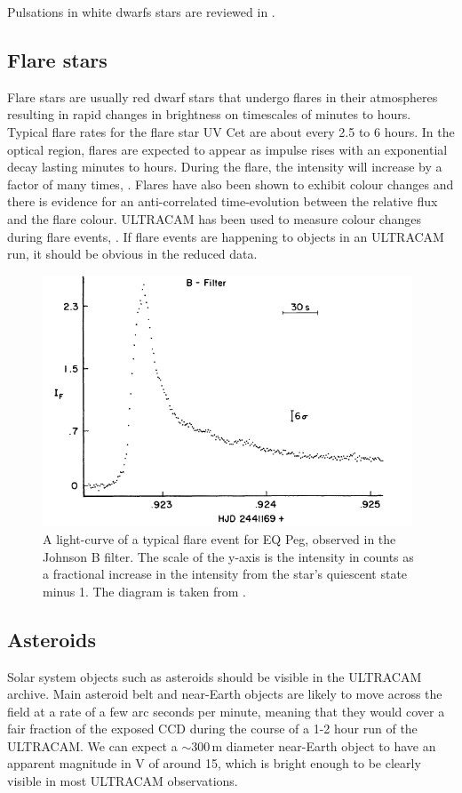 Pulsations in white dwarfs stars are reviewed in \citet{wingetreview}.

\subsection{Flare stars}
Flare stars are usually red dwarf stars that undergo flares in their atmospheres resulting in rapid changes in brightness on timescales of minutes to hours. Typical flare rates for the flare star {UV Cet} are about every 2.5 to 6 hours. In the optical region, flares are expected to appear as impulse rises with an exponential decay lasting minutes to hours. During the flare, the intensity will increase by a factor of many times, \citep{typicalflares}. Flares have also been shown to exhibit colour changes and there is evidence for an anti-correlated time-evolution between the relative flux and the flare colour. ULTRACAM has been used to measure colour changes during flare events, \citep{ULTRACAMFlare}. If flare events are happening to objects in an ULTRACAM run, it should be obvious in the reduced data.  


\begin{figure}
\centering
\includegraphics[width=110mm]{images/EQ_Peg_typical_flare.png}
\caption{A light-curve of a typical flare event for EQ Peg, observed in the Johnson B filter. The scale of the y-axis is the intensity in counts as a fractional increase in the intensity from the star's quiescent state minus 1. The diagram is taken from \citet{typicalflares}. }
\label{fig:flare}
\end{figure}

\subsection{Asteroids}
Solar system objects such as asteroids should be visible in the ULTRACAM archive. Main asteroid belt and near-Earth objects are likely to move across the field at a rate of a few arc seconds per minute, meaning that they would cover a fair fraction of the exposed CCD during the course of a 1-2 hour run of the ULTRACAM. We can expect a $\sim 300\,\mbox{m}$ diameter near-Earth object to have an apparent magnitude in V of around 15, \citep{neosmalltelescope} which is bright enough to be clearly visible in most ULTRACAM observations. 

